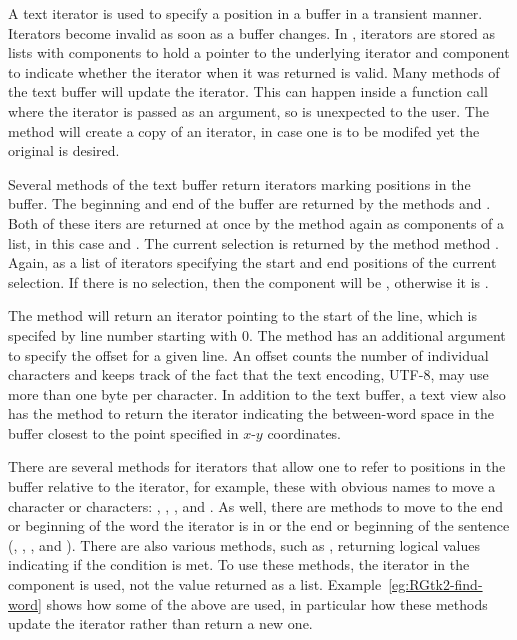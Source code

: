 A text iterator is used to specify a position in a buffer in a transient
manner. Iterators become invalid as soon as a buffer changes.  In
, iterators are stored as lists with components 
to hold a pointer to the underlying iterator and component
 to indicate whether the iterator when it was returned is
valid. Many methods of the text buffer will update the iterator. This
can happen inside a function call where the iterator is passed as an
argument, so is unexpected to the \R\/ user. The
 method will create a copy of an iterator,
in case one is to be modifed yet the original is desired.

Several methods of the text buffer return iterators marking positions in the buffer. 
The beginning and end of the
buffer are returned by the methods
 and
. Both of these iters are
returned at once by the method  again
as components of a list, in this case  and .
The current selection is returned by the method method
. Again, as a list of
iterators specifying the start and end positions of the current
selection. If there is no selection, then the component 
will be , otherwise it is .  

The method  will return an
iterator pointing to the start of the line, which is specifed by line
number starting with 0. The method  has an
additional argument to specify the offset for a given line. An offset
counts the number of individual characters and keeps track of the fact
that the text encoding, UTF-8, may use more than one byte per
character.  In addition to the text buffer, a text view also has the
method  to return the iterator
indicating the between-word space in the buffer closest to the point
specified in $x$-$y$ coordinates.

There are several methods for iterators that allow one to refer to
positions in the buffer relative to the iterator, for example, these
with obvious names to move a character or characters:
, ,
, and
. As well, there are methods to
move to the end or beginning of the word the iterator is in or the end
or beginning of the sentence (,
,
, and
).  There are also various methods,
such as , returning logical values
indicating if the condition is met.
To use these methods, the iterator in the
 component is used, not the value returned as a
list. Example~\ref{eg:RGtk2-find-word} shows how some of the above are
used, in particular how these methods update the iterator rather than
return a new one.

